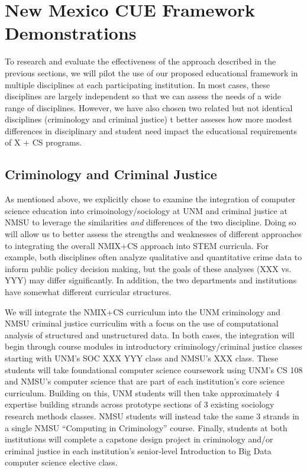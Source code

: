 \section{New Mexico CUE Framework Demonstrations}
\label{sec:pilots}

To research and evaluate the effectiveness of the approach described in the previous sections, we will pilot the use of our proposed educational framework in multiple disciplines at each participating institution. In most cases, these disciplines are largely independent so that we can assess the needs of a wide range of disciplines. However, we have also chosen two related but not identical disciplines (criminology and criminal justice) t better asseses how more modest differences in disciplinary and student need impact the educational requirements of X + CS programs.

\subsection{Criminology and Criminal Justice}
\label{sec:demo:crim}

As mentioned above, we explicitly chose to examine the integration of computer science education into crimoinology/sociology at UNM and criminal justice at NMSU to leverage the similarities \emph{and} differences of the two discipline. Doing so will allow us to better assess the strengths and weaknesses of different approaches to integrating the overall NMIX+CS approach into STEM curricula. For example, both disciplines often analyze qualitative and quantitative crime data to inform public policy decision making, but the goals of these analyses (XXX vs. YYY) may differ significantly. In addition, the two departments and institutions have somewhat different curricular structures. 

We will integrate the NMIX+CS curriculum into the UNM criminology and NMSU criminal justice curriculim with a focus on the use of computational analysis of structured and unstructured data. In both cases, the integration will begin through course modules in introductory criminology/criminal justice classes starting with UNM's SOC XXX YYY class and NMSU's XXX class. These students will take foundational computer science coursework using UNM's CS 108 and NMSU's computer science that are part of each institution's core science curriculum.  Building on this, UNM students will then take approximately 4 expertise building strands across prototype sections of 3 existing sociology research methods classes. NMSU students will instead take the same 3 strands in a single NMSU ``Computing in Criminology'' course. 
Finally, students at both institutions will complete a capstone design project in criminology and/or criminal justice in each institution's senior-level Introduction to Big Data computer science elective class. 


